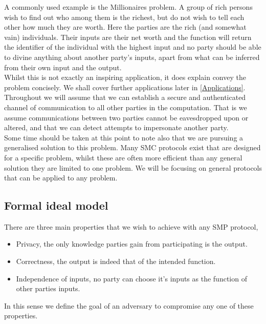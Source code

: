 \documentclass[a4paper,10pt]{article}
\begin{document}
			A commonly used example is the Millionaires problem. A group of rich persons wish to find out who among them is the richest, but do not wish to tell each other how much they are worth. Here the parties are the rich (and somewhat vain) individuals. Their inputs are their net worth and the function will return the identifier of the individual with the highest input and no party should be able to divine anything about another party's inputs, apart from what can be inferred from their own input and the output.\\
      
			Whilst this is not exactly an inspiring application, it does explain convey the problem concisely. We shall cover further applications later in \ref{Applications}.\\

			Throughout we will assume that we can establish a secure and authenticated channel of communication to all other parties in the computation. That is we assume communications between two parties cannot be eavesdropped upon or altered, and that we can detect attempts to impersonate another party.\\

			Some time should be taken at this point to note also that we are pursuing a generalised solution to this problem. Many SMC protocols exist that are designed for a specific problem, whilst these are often more efficient than any general solution they are limited to one problem. We will be focusing on general protocols that can be applied to any problem.


		\subsection{Formal ideal model}
			There are three main properties that we wish to achieve with any SMP protocol,
			\begin{itemize}
				\item Privacy, the only knowledge parties gain from participating is the output.
				\item Correctness, the output is indeed that of the intended function.
				\item Independence of inputs, no party can choose it's inputs as the function of other parties inputs.
			\end{itemize}

			In this sense we define the goal of an adversary to compromise any one of these properties.\\
\end{document}
